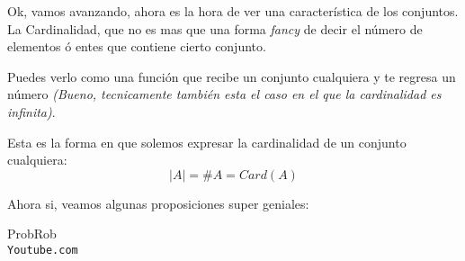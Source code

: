 \documentclass[12pt]{report}                                    %
\begin{document}
        Ok, vamos avanzando, ahora es la hora de ver una característica de los conjuntos.
        La Cardinalidad, que no es mas que una forma \emph{fancy} de decir el número de 
        elementos ó entes que contiene cierto conjunto.

        Puedes verlo como una función que
        recibe un conjunto cualquiera y te regresa un número \emph{(Bueno, tecnicamente también
        esta el caso en el que la cardinalidad es infinita)}.

        Esta es la forma en que solemos expresar la cardinalidad de un conjunto cualquiera:
        \begin{equation}   
            |A| = \#A = Card(A)
        \end{equation}


        Ahora si, veamos algunas proposiciones super geniales:






\clearpage

	\begin{thebibliography}{9}

		ProbRob
		\\\texttt{Youtube.com}


	 

\end{thebibliography}
\end{document}
